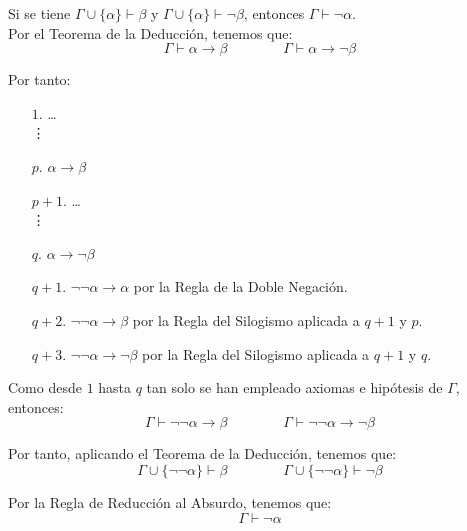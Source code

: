 \begin{ejercicio}\label{ej:1.6}
    Si se tiene $\Gamma \cup \{\alpha\} \vdash \beta$ y $\Gamma \cup \{\alpha\} \vdash \neg\beta$, entonces $\Gamma \vdash \neg\alpha$.\\

    Por el Teorema de la Deducción, tenemos que:
    \begin{equation*}
        \Gamma\vdash \alpha\rightarrow\beta\qquad\qquad\Gamma\vdash \alpha\rightarrow\neg\beta
    \end{equation*}

    Por tanto:
    \begin{enumerate}
        \item[$1$.] \ldots\\\vdots
        \item[$p$.] $\alpha\rightarrow\beta$
        \item[$p+1$.] \ldots\\\vdots
        \item[$q$.] $\alpha\rightarrow\neg\beta$
        \item[$q+1$.] $\neg\neg\alpha\rightarrow \alpha$ por la Regla de la Doble Negación.
        \item[$q+2$.] $\neg\neg\alpha\rightarrow\beta$ por la Regla del Silogismo aplicada a $q+1$ y $p$.
        \item[$q+3$.] $\neg\neg\alpha\rightarrow\neg\beta$ por la Regla del Silogismo aplicada a $q+1$ y $q$.
    \end{enumerate}

    Como desde $1$ hasta $q$ tan solo se han empleado axiomas e hipótesis de $\Gamma$, entonces:
    \begin{equation*}
        \Gamma\vdash \neg\neg\alpha\rightarrow\beta\qquad\qquad\Gamma\vdash \neg\neg\alpha\rightarrow\neg\beta
    \end{equation*}

    Por tanto, aplicando el Teorema de la Deducción, tenemos que:
    \begin{equation*}
        \Gamma \cup \{\neg\neg\alpha\} \vdash \beta\qquad\qquad\Gamma \cup \{\neg\neg\alpha\} \vdash \neg\beta
    \end{equation*}

    Por la Regla de Reducción al Absurdo, tenemos que:
    \begin{equation*}
        \Gamma \vdash \neg\alpha
    \end{equation*}
\end{ejercicio}


